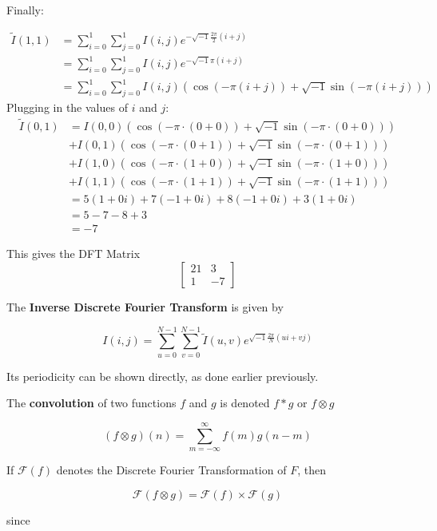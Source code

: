 \documentclass[a4paper]{article}
\begin{document}
Finally:

	    \begin{align*}	     
	    \tilde{I}(1,1)&=\sum_{i=0}^1\sum_{j=0}^1I(i, j)e^{-\sqrt{-1}\frac{2\pi}{2}\left(i + j\right)}
			\\&=\sum_{i=0}^1\sum_{j=0}^1I(i,j)e^{-\sqrt{-1}\pi (i+j)}
			\\&=\sum_{i=0}^1\sum_{j=0}^1I(i,j)\left(\cos{\left(-\pi (i+j)\right)}+\sqrt{-1}\sin{\left(-\pi (i+j)\right)}\right)
	    \end{align*}
	    Plugging in the values of $i$ and $j$:
	    \begin{align*}
	    \tilde{I}(0,1)&=I(0,0)\left(\cos{\left(-\pi\cdot(0+0)\right)}+\sqrt{-1}\sin{\left(-\pi\cdot(0+0)\right)}\right)
			\\&+I(0,1)\left(\cos{\left(-\pi\cdot(0+1)\right)}+\sqrt{-1}\sin{\left(-\pi\cdot(0+1)\right)}\right)
			\\&+I(1,0)\left(\cos{\left(-\pi\cdot(1+0)\right)}+\sqrt{-1}\sin{\left(-\pi\cdot(1+0)\right)}\right)
			\\&+I(1,1)\left(\cos{\left(-\pi\cdot(1+1)\right)}+\sqrt{-1}\sin{\left(-\pi\cdot(1+1)\right)}\right)
			\\&=5\left(1+0i\right)+7\left(-1+0i\right)+8\left(-1+0i\right)+3\left(1+0i\right)
			\\&=5-7-8+3
			\\&=-7
	    \end{align*}
	     
This gives the DFT Matrix \[\begin{bmatrix}21&3\\1&-7\end{bmatrix}\]

The \textbf{Inverse Discrete Fourier Transform} is given by 

\[I(i, j)=\sum_{u=0}^{N-1}\sum_{v=0}^{N-1}\tilde{I}(u,v)e^{\sqrt{-1}\frac{2\pi}{N}\left(ui+vj\right)}\]

Its periodicity can be shown directly, as done earlier previously. 

The \textbf{convolution} of two functions $f$ and $g$ is denoted $f*g$ or $f\otimes g$

\[(f\otimes g)(n)=\sum_{m=-\infty}^{\infty}f(m)g(n-m)\]

If $\mathcal{F}(f)$ denotes the Discrete Fourier Transformation of $F$, then 

\[\mathcal{F}(f\otimes g)=\mathcal{F}(f)\times\mathcal{F}(g)\]

since
\end{document}
